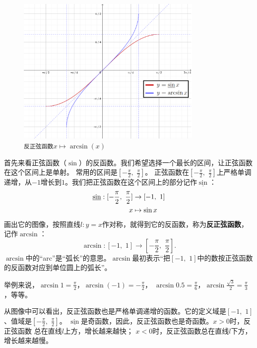 \documentclass[12pt,UTF8]{ctexbook}
\begin{document}
\begin{figure}[h] %
    \vspace{4pt}
    \centering
    \includegraphics[width=0.8\textwidth]{反正弦函数1.png}
    \caption*{\texttt{反正弦函数}$x\mapsto \arcsin(x)$}
\end{figure}

首先来看正弦函数（$\sin$）的反函数。我们希望选择一个最长的区间，让正弦函数在这个区间上是单射。
常用的区间是$[-\frac{\pi}{2}, \,\, \frac{\pi}{2}]$。
正弦函数在$[-\frac{\pi}{2}, \,\, \frac{\pi}{2}]$上严格单调递增，从$-1$增长到$1$。我们把正弦函数在这个区间上的部分记作$\underline{\sin}$：
\begin{align}
     \underline{\sin} : [-\frac{\pi}{2}, \,\, \frac{\pi}{2}] &\rightarrow [-1,\,\, 1]\notag \\
                                                           x &\mapsto \sin{x} \notag
\end{align}
画出它的图像，按照直线$l: y = x$作对称，就得到它的反函数，称为\textbf{反正弦函数}，记作$\arcsin$：
$$ \arcsin : [-1,\,\, 1] \rightarrow [-\frac{\pi}{2}, \,\, \frac{\pi}{2}] . $$
$\arcsin$中的“arc”是“弧长”的意思。$\arcsin$最初表示“把$[-1,\,\, 1]$中的数按正弦函数的反函数对应到单位圆上的弧长”。

举例来说，$\arcsin{1} = \frac{\pi}{2}$，$\arcsin{(-1)} = -\frac{\pi}{2}$，
$\arcsin{0.5} = \frac{\pi}{6}$，$\arcsin{\frac{\sqrt{3}}{2}} = \frac{\pi}{3}$，等等。

从图像中可以看出，反正弦函数也是严格单调递增的函数。它的定义域是$[-1,\,\, 1]$、值域是$[-\frac{\pi}{2}, \,\, \frac{\pi}{2}]$。
$\underline{\sin}$是奇函数，因此，反正弦函数也是奇函数。$x > 0$时，反正弦函数
总在直线$l$上方，增长越来越快；
$x < 0$时，反正弦函数总在直线$l$下方，增长越来越慢。
\end{document}
